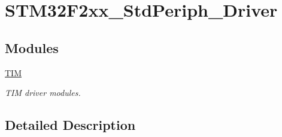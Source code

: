 \hypertarget{group___s_t_m32_f2xx___std_periph___driver}{\section{S\-T\-M32\-F2xx\-\_\-\-Std\-Periph\-\_\-\-Driver}
\label{group___s_t_m32_f2xx___std_periph___driver}
}
\subsection*{Modules}
\begin{DoxyCompactItemize}
\item 
\hyperlink{group___t_i_m}{T\-I\-M}
\begin{DoxyCompactList}\small\item\em T\-I\-M driver modules. \end{DoxyCompactList}\end{DoxyCompactItemize}


\subsection{Detailed Description}
